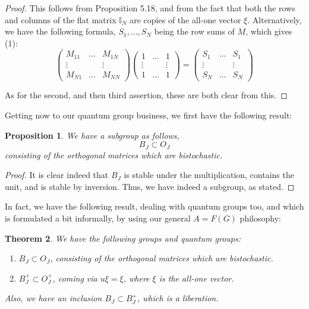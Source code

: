 \documentclass[12pt]{amsbook}
\newtheorem{theorem}{Theorem}[chapter]
\newtheorem{proposition}[theorem]{Proposition}
\begin{document}
\begin{proof}
This follows from Proposition 5.18, and from the fact that both the rows and columns of the flat matrix $\mathbb I_N$ are copies of the all-one vector $\xi$. Alternatively, we have the following formula, $S_1,\ldots,S_N$ being the row sums of $M$, which gives (1):
$$\begin{pmatrix}
M_{11}&\ldots&M_{1N}\\
\vdots&&\vdots\\
M_{N1}&\ldots&M_{NN}
\end{pmatrix}
\begin{pmatrix}
1&\ldots&1\\
\vdots&&\vdots\\
1&\ldots&1
\end{pmatrix}
=\begin{pmatrix}
S_1&\ldots&S_1\\
\vdots&&\vdots\\
S_N&\ldots&S_N
\end{pmatrix}$$

As for the second, and then third assertion, these are both clear from this.
\end{proof}

Getting now to our quantum group business, we first have the following result:


\begin{proposition}
We have a subgroup as follows,
$$B_J\subset O_J$$
consisting of the orthogonal matrices which are bistochastic.
\end{proposition}

\begin{proof}
It is clear indeed that $B_J$ is stable under the multiplication, contains the unit, and is stable by inversion. Thus, we have indeed a subgroup, as stated.
\end{proof}

In fact, we have the following result, dealing with quantum groups too, and which is formulated a bit informally, by using our general $A=F(G)$ philosophy:


\begin{theorem}
We have the following groups and quantum groups:
\begin{enumerate}
\item $B_J\subset O_J$, consisting of the orthogonal matrices which are bistochastic.

\item $B_J^+\subset O_J^+$, coming via $u\xi=\xi$, where $\xi$ is the all-one vector.
\end{enumerate}
Also, we have an inclusion $B_J\subset B_J^+$, which is a liberation.
\end{theorem}
\end{document}
